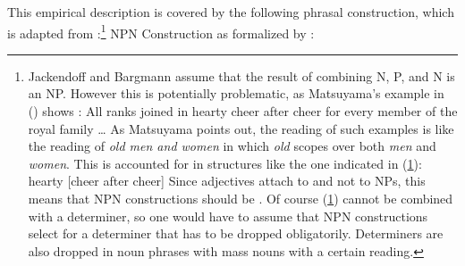 \documentclass[output=paper
	        ,collection
	        ,collectionchapter
 	        ,biblatex
                ,babelshorthands
                ,newtxmath
                ,draftmode
                ,colorlinks, citecolor=brown
]{langscibook}
\begin{document}
This empirical description is covered by the following phrasal construction, which is adapted from
:\footnote{%
Jackendoff and Bargmann assume that the result of combining N, P, and N is an NP. However this is
potentially problematic, as Matsuyama's example in () shows \citep[]{Matsuyama2004a}:
\ea
All ranks joined in hearty cheer after cheer for every member of the royal family \ldots
\z
As Matsuyama points out, the reading of such examples is like the reading of \emph{old men and women}
in which \emph{old} scopes over both \emph{men} and \emph{women}. This is accounted for in
structures like the one indicated in (\ref{ex-hearty-cheer-after-cheer}):
\ea
\label{ex-hearty-cheer-after-cheer}
hearty [cheer after cheer]
\z
Since adjectives attach to \nbars and not to NPs, this means that NPN constructions should be
\nbars. Of course (\ref{ex-hearty-cheer-after-cheer}) cannot be combined with a determiner, so one would have to assume that
NPN constructions select for a determiner that has to be dropped obligatorily. Determiners are also
dropped in noun phrases with mass nouns with a certain reading.
}
\ea
\label{ex-npn-bragmann}%
NPN Construction as formalized by :\\
\end{document}
